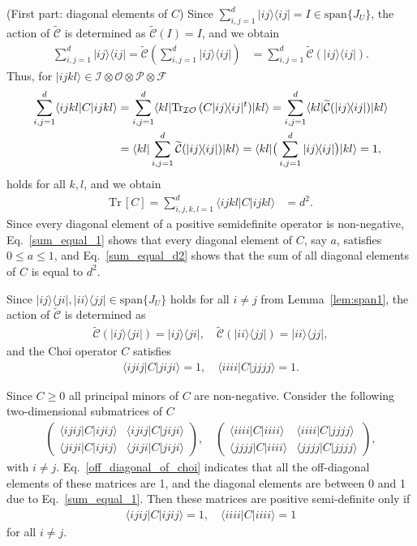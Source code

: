 \documentclass[a4paper,twocolumn,accepted=2022-10-23]{quantumarticle}
\newcommand{\bra}[1]{\langle {#1} \vert}
\newcommand{\ket}[1]{\vert {#1} \rangle}
\newcommand{\proj}[1]{\vert {#1} \rangle\!\langle {#1} \vert}
\newcommand{\ketbra}[2]{\vert {#1} \rangle\!\langle {#2} \vert}
\newcommand{\Tr}[0]{{\mathrm{Tr}}}
\newcommand{\fcal}[0]{{\mathcal{F}}}
\newcommand{\ical}[0]{{\mathcal{I}}}
\newcommand{\ocal}[0]{{\mathcal{O}}}
\newcommand{\pcal}[0]{{\mathcal{P}}}
\newcommand{\tmap}[1]{\widetilde{\mbox{$\mathcal{#1}$}}}
\theoremstyle{definition}
\begin{document}
(First part: diagonal elements of $C$)\quad
Since $\sum_{i,j=1}^d \proj{ij} = I \in \mathrm{span}\{J_U\}$, the action of $\tmap{C}$ is determined as $\tmap{C}(I) = I$, and we obtain
\begin{align}
\sum_{i,j=1}^d \proj{ij} = \tmap{C} (\sum_{i,j=1}^d \proj{ij}) &= \sum_{i,j=1}^d \tmap{C} (\proj{ij}).
\end{align}
Thus, for $\ket{ijkl} \in \ical \otimes \ocal \otimes \pcal \otimes \fcal$
\begin{align}
\sum_{i,j=1}^d \bra{ijkl} C \ket{ijkl} &= \sum_{i,j=1}^d \bra{kl}  \Tr_{\mathcal{IO}}\, (C \proj{ij}^t)\ket{kl} = \sum_{i,j=1}^d \bra{kl} \tmap{C} (\proj{ij}) \ket{kl} \notag \\
&= \bra{kl} \sum_{i,j=1}^d \tmap{C} (\proj{ij}) \ket{kl} = \bra{kl} \big( \sum_{i,j=1}^d \proj{ij}  \big) \ket{kl} = 1, \label{sum_equal_1}
\end{align}
holds for all $k,l$, and we obtain
\begin{align}
\Tr\, [C] = \sum_{i,j,k,l=1}^d \bra{ijkl} C \ket{ijkl} &= d^2 \label{sum_equal_d2}.
\end{align}
Since every diagonal element of a positive semidefinite operator is non-negative,
Eq.~\eqref{sum_equal_1} shows that every diagonal element of $C$, say $a$, satisfies $0 \leq a \leq 1$,
and Eq.~\eqref{sum_equal_d2} shows that the sum of all diagonal elements of $C$ is equal to $d^2$.


Since $\ketbra{ij}{ji},\ketbra{ii}{jj} \in \mathrm{span} \{ J_U \}$ holds for all $ i \neq j$ from Lemma~\ref{lem:span1}, the action of $\tmap{C}$ is determined as
\begin{align}
\tmap{C} ( \ketbra{ij}{ji} ) = \ketbra{ij}{ji}, \quad \tmap{C} ( \ketbra{ii}{jj} ) = \ketbra{ii}{jj},
\end{align}
and the Choi operator $C$ satisfies
\begin{align}
\bra{ijij} C \ket{jiji} = 1, \quad \bra{iiii} C \ket{jjjj} = 1. \label{off_diagonal_of_choi}
\end{align}

Since $C \geq 0$ all principal minors of $C$ are non-negative.
Consider the following two-dimensional submatrices of $C$
\begin{align}
\begin{pmatrix}
\bra{ijij} C \ket{ijij} & \bra{ijij} C \ket{jiji} \\
\bra{jiji} C \ket{ijij} & \bra{jiji} C \ket{jiji}
\end{pmatrix},
\quad
\begin{pmatrix}
\bra{iiii} C \ket{iiii} & \bra{iiii} C \ket{jjjj} \\
\bra{jjjj} C \ket{iiii} & \bra{jjjj} C \ket{jjjj}
\end{pmatrix},
\end{align}
with $i\neq j$.
Eq.~\eqref{off_diagonal_of_choi} indicates that all the off-diagonal elements of these matrices are 1,
and the diagonal elements are between 0 and 1 due to Eq.~\eqref{sum_equal_1}.
Then these matrices are positive semi-definite only if
\begin{align}
\bra{ijij} C \ket{ijij} = 1, \quad \bra{iiii} C \ket{iiii}=1 \label{diagonal_of_choi}
\end{align}
for all $i \neq j$.
\end{document}
